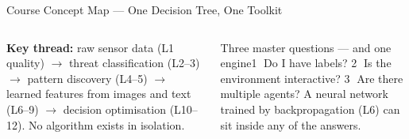 \documentclass[aspectratio=169,10pt,t]{beamer}
\begin{document}
\begin{frame}{Course Concept Map --- One Decision Tree, One Toolkit}
{}
\begin{columns}[T]
\begin{rbox}\scriptsize\textbf{Key thread:} raw sensor data (L1 quality) $\to$ threat classification (L2--3) $\to$ pattern discovery (L4--5) $\to$ learned features from images and text (L6--9) $\to$ decision optimisation (L10--12). No algorithm exists in isolation.\end{rbox}
\begin{cbox}[AccentCol]{Three master questions --- and one engine}\scriptsize \textcircled{\tiny1} Do I have labels? \textcircled{\tiny2} Is the environment interactive? \textcircled{\tiny3} Are there multiple agents? A neural network trained by backpropagation (L6) can sit inside any of the answers.\end{cbox}
\end{columns}
\end{frame}
\end{document}

